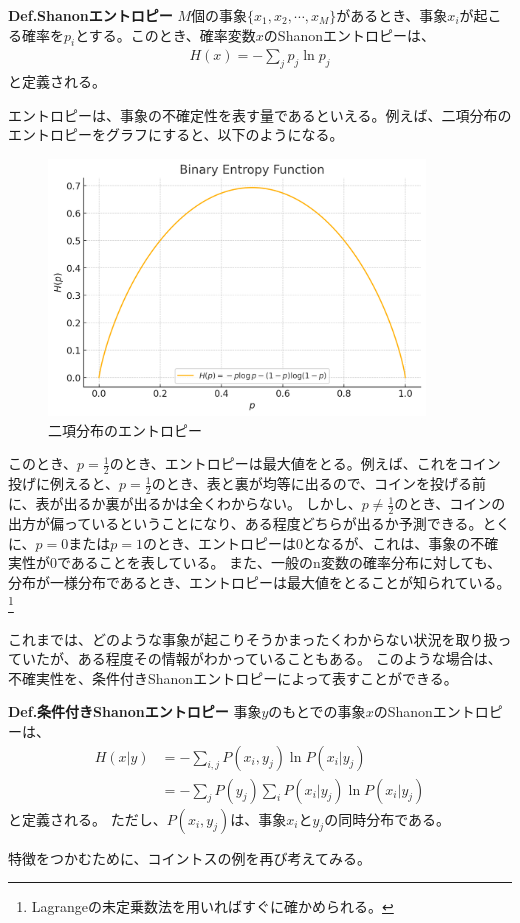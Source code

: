 \documentclass[a4paper,11pt]{jsarticle}
\numberwithin{equation}{section}
\begin{document}
\begin{itembox}[l]{\textbf{Def.Shanonエントロピー}}
    $M$個の事象$\{x_1, x_2, \cdots, x_M\}$があるとき、事象$x_i$が起こる確率を$p_i$とする。このとき、確率変数$x$のShanonエントロピーは、
    \begin{align}
        H(x) = -\sum_{j} p_j \ln p_j
    \end{align}
    と定義される。
\end{itembox}
エントロピーは、事象の不確定性を表す量であるといえる。例えば、二項分布のエントロピーをグラフにすると、以下のようになる。
\begin{figure}[H]
    \begin{center}
    \includegraphics[width=100mm]{entropy.png}
    \end{center}
    \caption{二項分布のエントロピー}
    \label{fig:entropy}
\end{figure}
\indent
このとき、$p=\frac{1}{2}$のとき、エントロピーは最大値をとる。例えば、これをコイン投げに例えると、$p=\frac{1}{2}$のとき、表と裏が均等に出るので、コインを投げる前に、表が出るか裏が出るかは全くわからない。
しかし、$p\neq \frac{1}{2}$のとき、コインの出方が偏っているということになり、ある程度どちらが出るか予測できる。とくに、$p=0$または$p=1$のとき、エントロピーは0となるが、これは、事象の不確実性が0であることを表している。
また、一般のn変数の確率分布に対しても、分布が一様分布であるとき、エントロピーは最大値をとることが知られている。\footnote{
    Lagrangeの未定乗数法を用いればすぐに確かめられる。
}

これまでは、どのような事象が起こりそうかまったくわからない状況を取り扱っていたが、ある程度その情報がわかっていることもある。
このような場合は、不確実性を、条件付きShanonエントロピーによって表すことができる。
\begin{itembox}[l]{\textbf{Def.条件付きShanonエントロピー}}
    事象$y$のもとでの事象$x$のShanonエントロピーは、
    \begin{align}
        H(x|y) &= -\sum_{i,j}P(x_i,y_j) \ln P(x_i|y_j)\\
        &= -\sum_{j}P(y_j) \sum_{i}P(x_i|y_j) \ln P(x_i|y_j)
    \end{align}
    と定義される。
    ただし、$P(x_i,y_j)$は、事象$x_i$と$y_j$の同時分布である。
\end{itembox}
特徴をつかむために、コイントスの例を再び考えてみる。
\end{document}
